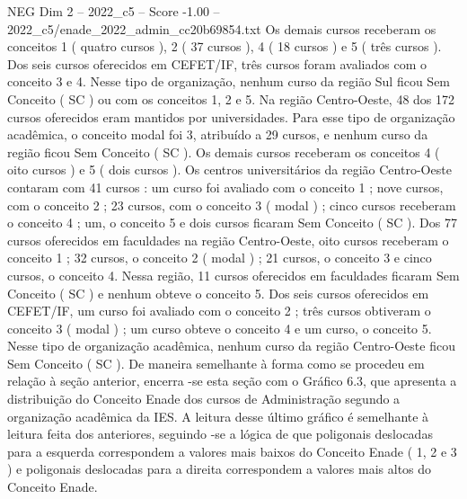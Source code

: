 \begin{textsample}{NEG Dim 2 – 2022\_c5 – Score -1.00 – 2022\_c5/enade\_2022\_admin\_cc20b69854.txt}
Os demais cursos receberam os conceitos 1 ( quatro cursos ), 2 ( 37 cursos ), 4 ( 18 cursos ) e 5 ( três cursos ).
Dos seis cursos oferecidos em CEFET/IF, três cursos foram avaliados com o conceito 3 e 4.
Nesse tipo de organização, nenhum curso da região Sul ficou Sem Conceito ( SC ) ou com os conceitos 1, 2 e 5.
Na região Centro-Oeste, 48 dos 172 cursos oferecidos eram mantidos por universidades.
Para esse tipo de organização acadêmica, o conceito modal foi 3, atribuído a 29 cursos, e nenhum curso da região ficou Sem Conceito ( SC ).
Os demais cursos receberam os conceitos 4 ( oito cursos ) e 5 ( dois cursos ).
Os centros universitários da região Centro-Oeste contaram com 41 cursos : um curso foi avaliado com o conceito 1 ; nove cursos, com o conceito 2 ; 23 cursos, com o conceito 3 ( modal ) ; cinco cursos receberam o conceito 4 ; um, o conceito 5 e dois cursos ficaram Sem Conceito ( SC ).
Dos 77 cursos oferecidos em faculdades na região Centro-Oeste, oito cursos receberam o conceito 1 ; 32 cursos, o conceito 2 ( modal ) ; 21 cursos, o conceito 3 e cinco cursos, o conceito 4.
Nessa região, 11 cursos oferecidos em faculdades ficaram Sem Conceito ( SC ) e nenhum obteve o conceito 5.
Dos seis cursos oferecidos em CEFET/IF, um curso foi avaliado com o conceito 2 ; três cursos obtiveram o conceito 3 ( modal ) ; um curso obteve o conceito 4 e um curso, o conceito 5.
Nesse tipo de organização acadêmica, nenhum curso da região Centro-Oeste ficou Sem Conceito ( SC ).
De maneira semelhante à forma como se procedeu em relação à seção anterior, encerra -se esta seção com o Gráfico 6.3, que apresenta a distribuição do Conceito Enade dos cursos de Administração segundo a organização acadêmica da IES.
A leitura desse último gráfico é semelhante à leitura feita dos anteriores, seguindo -se a lógica de que poligonais deslocadas para a esquerda correspondem a valores mais baixos do Conceito Enade ( 1, 2 e 3 ) e poligonais deslocadas para a direita correspondem a valores mais altos do Conceito Enade.

\end{textsample}
